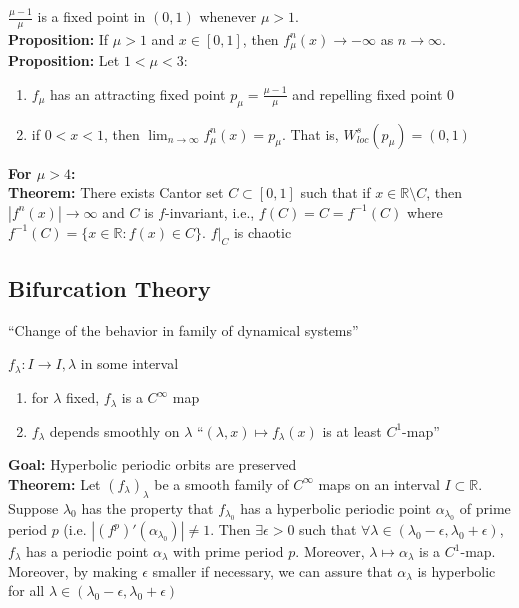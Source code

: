 \documentclass[12pt]{article}
\begin{document}
$\frac{\mu - 1}{\mu}$ is a fixed point in $(0, 1)$ whenever $\mu > 1$.\\

\textbf{Proposition:} If $\mu > 1$ and $x \in [0,1]$, then $f_{\mu}^n(x) \to -\infty$ as $n \to \infty$.\\

\textbf{Proposition:} Let $1 < \mu < 3$:
\begin{enumerate}[label=(\alph*)]

\item $f_{\mu}$ has an attracting fixed point $p_{\mu} = \frac{\mu - 1}{\mu}$ and repelling fixed point $0$
\item if $0 < x < 1$, then $\lim_{n \to \infty} f^n_{\mu}(x) = p_{\mu}$. That is, $W^s_{loc}(p_{\mu}) = (0, 1)$

\end{enumerate}

\textbf{For $\mu > 4$:}\\

\textbf{Theorem:} There exists Cantor set $C \subset [0, 1]$ such that if $x \in \mathbb{R} \setminus C$, then $|f^n(x)| \to \infty$ and $C$ is $f$-invariant, i.e., $f(C) = C = f^{-1}(C)$ where $f^{-1}(C) = \{x \in \mathbb{R}: f(x) \in C\}$. $f|_C$ is chaotic

\subsection{Bifurcation Theory}

``Change of the behavior in family of dynamical systems''

$f_{\lambda}: I \to I, \lambda$ in some interval
\begin{enumerate}
\item for $\lambda$ fixed, $f_{\lambda}$ is a $C^{\infty}$ map
\item $f_{\lambda}$ depends smoothly on $\lambda$ ``$(\lambda, x) \mapsto f_{\lambda}(x)$ is at least $C^1$-map''
\end{enumerate}

\textbf{Goal:} Hyperbolic periodic orbits are preserved\\

\textbf{Theorem:} Let $(f_{\lambda})_{\lambda}$ be a smooth family of $C^{\infty}$ maps on an interval $I \subset \mathbb{R}$. Suppose $\lambda_0$ has the property that $f_{\lambda_0}$ has a hyperbolic periodic point $\alpha_{\lambda_0}$ of prime period $p$ (i.e. $|(f^p)'(\alpha_{\lambda_0})| \neq 1$. Then $\exists \epsilon > 0$ such that $\forall \lambda \in (\lambda_0 - \epsilon, \lambda_0 + \epsilon)$, $f_{\lambda}$ has a periodic point $\alpha_{\lambda}$ with prime period $p$. Moreover, $\lambda \mapsto \alpha_{\lambda}$ is a $C^1$-map. Moreover, by making $\epsilon$ smaller if necessary, we can assure that $\alpha_{\lambda}$ is hyperbolic for all $\lambda \in (\lambda_0 - \epsilon, \lambda_0 + \epsilon)$\\
\end{document}
